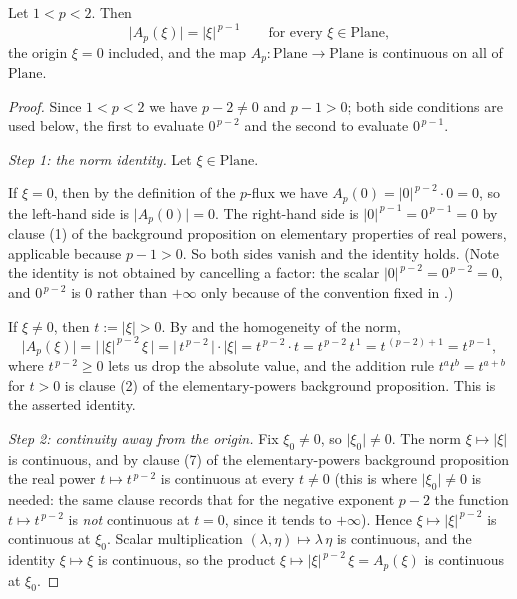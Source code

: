\begin{lemma}
Let $1<p<2$.  Then
\[
  \lvert A_p(\xi)\rvert=\lvert\xi\rvert^{\,p-1}\qquad\text{for every }\xi\in\mathrm{Plane},
\]
the origin $\xi=0$ included, and the map $A_p\colon\mathrm{Plane}\to\mathrm{Plane}$ is
continuous on all of $\mathrm{Plane}$.
\end{lemma}
\begin{proof}
Since $1<p<2$ we have $p-2\neq0$ and $p-1>0$; both side conditions are used below, the first
to evaluate $0^{\,p-2}$ and the second to evaluate $0^{\,p-1}$.

\medskip\noindent\emph{Step 1: the norm identity.}
Let $\xi\in\mathrm{Plane}$.

If $\xi=0$, then by the definition of the $p$-flux  we have
$A_p(0)=\lvert0\rvert^{\,p-2}\cdot0=0$, so the left-hand side is $\lvert A_p(0)\rvert=0$.  The
right-hand side is $\lvert0\rvert^{\,p-1}=0^{\,p-1}=0$ by clause (1) of the background
proposition on elementary properties of real powers, applicable because $p-1>0$.  So both sides
vanish and the identity holds.  (Note the identity is not obtained by cancelling a factor: the
scalar $\lvert0\rvert^{\,p-2}=0^{\,p-2}=0$, and $0^{\,p-2}$ is $0$ rather than $+\infty$ only
because of the convention fixed in .)

If $\xi\neq0$, then $t:=\lvert\xi\rvert>0$.  By  and the homogeneity of the norm,
\[
  \lvert A_p(\xi)\rvert
  =\bigl\lvert\,\lvert\xi\rvert^{\,p-2}\,\xi\,\bigr\rvert
  =\bigl\lvert\,t^{\,p-2}\,\bigr\rvert\cdot\lvert\xi\rvert
  =t^{\,p-2}\cdot t
  =t^{\,p-2}\,t^{\,1}
  =t^{\,(p-2)+1}
  =t^{\,p-1},
\]
where $t^{\,p-2}\ge0$ lets us drop the absolute value, and the addition rule
$t^{a}t^{b}=t^{a+b}$ for $t>0$ is clause (2) of the elementary-powers background proposition.
This is the asserted identity.

\medskip\noindent\emph{Step 2: continuity away from the origin.}
Fix $\xi_0\neq0$, so $\lvert\xi_0\rvert\neq0$.  The norm $\xi\mapsto\lvert\xi\rvert$ is
continuous, and by clause (7) of the elementary-powers background proposition the real power
$t\mapsto t^{\,p-2}$ is continuous at every $t\neq0$ (this is where $\lvert\xi_0\rvert\neq0$ is
needed: the same clause records that for the negative exponent $p-2$ the function
$t\mapsto t^{\,p-2}$ is \emph{not} continuous at $t=0$, since it tends to $+\infty$).  Hence
$\xi\mapsto\lvert\xi\rvert^{\,p-2}$ is continuous at $\xi_0$.  Scalar multiplication
$(\lambda,\eta)\mapsto\lambda\,\eta$ is continuous, and the identity $\xi\mapsto\xi$ is
continuous, so the product $\xi\mapsto\lvert\xi\rvert^{\,p-2}\,\xi=A_p(\xi)$ is continuous at
$\xi_0$.


\end{proof}
